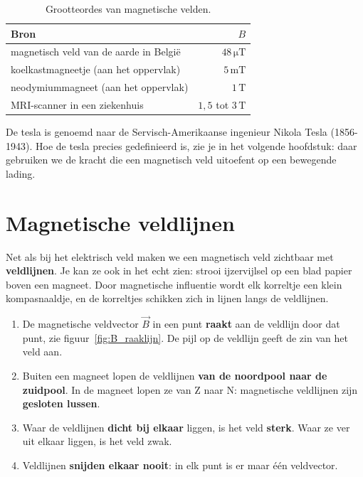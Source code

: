 \documentclass{ximera}
\begin{document}
\begin{table}[ht!]
    \begin{center}
        \begin{tabular}{l r}
            \toprule
            Bron & $B$ \\
            \midrule
            magnetisch veld van de aarde in België & $48\,\mathrm{\mu T}$ \\
            koelkastmagneetje (aan het oppervlak) & $5\,\mathrm{mT}$ \\
            neodymiummagneet (aan het oppervlak) & $1\,\mathrm{T}$ \\
            MRI-scanner in een ziekenhuis & $1{,}5$ tot $3\,\mathrm{T}$ \\
            \bottomrule
        \end{tabular}
    \end{center}
    \caption{Grootteordes van magnetische velden.}
    \label{tab:waarden_B}
\end{table}

\begin{remark}[expandable=true,title={Waar komt de eenheid tesla vandaan?}]\nl
    De tesla is genoemd naar de Servisch-Amerikaanse ingenieur Nikola Tesla (1856-1943). Hoe de tesla precies gedefinieerd is, zie je in het volgende hoofdstuk: daar gebruiken we de kracht die een magnetisch veld uitoefent op een bewegende lading.
\end{remark}

\section{Magnetische veldlijnen}\label{sec:magnetische-veldlijnen}
Net als bij het elektrisch veld maken we een magnetisch veld zichtbaar met \textbf{veldlijnen}. Je kan ze ook in het echt zien: strooi ijzervijlsel op een blad papier boven een magneet. Door magnetische influentie wordt elk korreltje een klein kompasnaaldje, en de korreltjes schikken zich in lijnen langs de veldlijnen.

\begin{proposition}[foldable=true,title={Regels voor magnetische veldlijnen}]\nl
    \begin{enumerate}
        \item De magnetische veldvector $\vec{B}$ in een punt \textbf{raakt} aan de veldlijn door dat punt, zie figuur~\ref{fig:B_raaklijn}. De pijl op de veldlijn geeft de zin van het veld aan.
        \item Buiten een magneet lopen de veldlijnen \textbf{van de noordpool naar de zuidpool}. In de magneet lopen ze van Z naar N: magnetische veldlijnen zijn \textbf{gesloten lussen}.
        \item Waar de veldlijnen \textbf{dicht bij elkaar} liggen, is het veld \textbf{sterk}. Waar ze ver uit elkaar liggen, is het veld zwak.
        \item Veldlijnen \textbf{snijden elkaar nooit}: in elk punt is er maar één veldvector.
    \end{enumerate}
\end{proposition}
\end{document}
